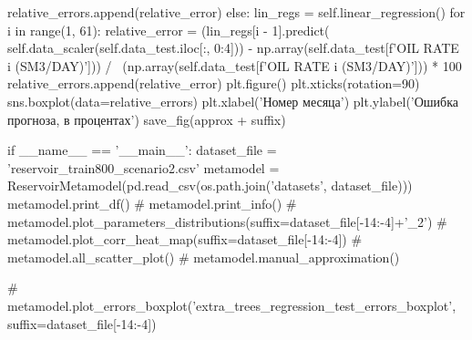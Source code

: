 \begin{pythoncode}
                relative_errors.append(relative_error)
        else:
            lin_regs = self.linear_regression()
            for i in range(1, 61):
                relative_error = (lin_regs[i - 1].predict(
                    self.data_scaler(self.data_test.iloc[:, 0:4])) -
                                  np.array(self.data_test[f'OIL RATE {i} (SM3/DAY)'])) / \
                                 (np.array(self.data_test[f'OIL RATE {i} (SM3/DAY)'])) * 100
                relative_errors.append(relative_error)
        plt.figure()
        plt.xticks(rotation=90)
        sns.boxplot(data=relative_errors)
        plt.xlabel('Номер месяца')
        plt.ylabel('Ошибка прогноза, в процентах')
        save_fig(approx + suffix)


if __name__ == '__main__':
    dataset_file = 'reservoir_train800_scenario2.csv'
    metamodel = ReservoirMetamodel(pd.read_csv(os.path.join('datasets', dataset_file)))
    metamodel.print_df()
    # metamodel.print_info()
    # metamodel.plot_parameters_distributions(suffix=dataset_file[-14:-4]+'_2')
    # metamodel.plot_corr_heat_map(suffix=dataset_file[-14:-4])
    # metamodel.all_scatter_plot()
    # metamodel.manual_approximation()

    # metamodel.plot_errors_boxplot('extra_trees_regression_test_errors_boxplot', suffix=dataset_file[-14:-4])


\end{pythoncode}
